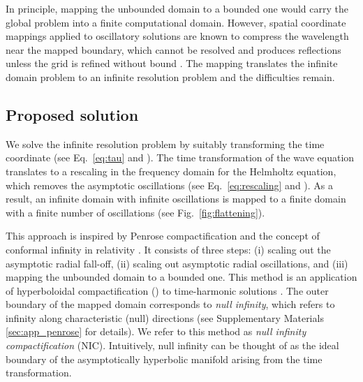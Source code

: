 \documentclass[onefignum,onetabnum]{siamart190516}
\newcommand{\SM}{Supplementary Materials }
\begin{document}
In principle, mapping the unbounded domain to a bounded one would carry the global problem into a finite computational domain. However, spatial coordinate mappings applied to oscillatory solutions are known to compress the wavelength near the mapped boundary, which cannot be resolved and produces reflections unless the grid is refined without bound \cite{GroschOrszag77, boyd1982optimization, shen2014approximations}. The mapping translates the infinite domain problem to an infinite resolution problem and the difficulties remain.



\subsection{Proposed solution}
We solve the infinite resolution problem by suitably transforming the time coordinate (see Eq.~\eqref{eq:tau} and \cite{Zenginoglu08, ZENGINOGLU20112286}). The time transformation of the wave equation translates to a rescaling in the frequency domain for the Helmholtz equation, which removes the asymptotic oscillations (see Eq.~\eqref{eq:rescaling} and \cite{ZengFramework}). As a result, an infinite domain with infinite oscillations is mapped to a finite domain with a finite number of oscillations (see Fig.~\ref{fig:flattening}).

This approach is inspired by Penrose compactification and the concept of conformal infinity in relativity \cite{Penrose, Penrose65, Frauendiener2004, Winicour2012, kroon2017conformal}. It consists of three steps: (i) scaling out the asymptotic radial fall-off, (ii) scaling out asymptotic radial oscillations, and (iii) mapping the unbounded domain to a bounded one. This method is an application of hyperboloidal compactification (\cite{Zenginoglu08, ZENGINOGLU20112286, Macedo_2020, panosso2024hyperboloidal}) to time-harmonic solutions \cite{ZengFramework, ansorg2016spectral, macedo2018hyperboloidal, bizon2020toy, jaramillo2021pseudospectrum}. The outer boundary of the mapped domain corresponds to \emph{null infinity}, which refers to infinity along characteristic (null) directions (see \SM \ref{sec:app_penrose} for details). We refer to this method as \emph{null infinity compactification} (NIC). Intuitively, null infinity can be thought of as the ideal boundary of the asymptotically hyperbolic manifold arising from the time transformation.
\end{document}
